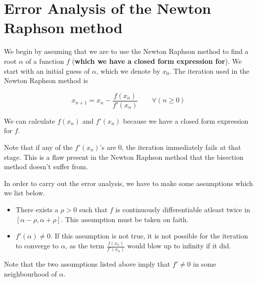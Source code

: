 
\section{Error Analysis of the Newton Raphson method}

We begin by assuming that we are to use the Newton Raphson method to find a root $\alpha$ of a function $f$ (\textbf{which we have a closed form expression for}). We start with an initial guess of $\alpha$, which we denote by $x_0$.
The iteration used in the Newton Raphson method is
\begin{defn}
  \label{feb28:def:iter}
  \[
    x_{n+1} = x_n - \frac{f(x_n)}{f'(x_n)} \qquad \forall(n \geq 0)
  \]
\end{defn}
We can calculate $f(x_n)$ and $f'(x_n)$ because we have a closed form expression for $f$.

Note that if any of the $f'(x_n)$'s are 0, the iteration immediately fails at that stage. This is a flaw present in the Newton Raphson method that the bisection method doesn't suffer from.

In order to carry out the error analysis, we have to make some assumptions which we list below.
\begin{itemize}
\item
  There exists a $\rho > 0$ such that $f$ is continuously differentiable atleast twice in $[\alpha - \rho, \alpha + \rho]$. This assumption must be taken on faith.
\item
  $f'(\alpha) \neq 0$. If this assumption is not true, it is not possible for the iteration to converge to $\alpha$, as the term $\frac{f(x_n)}{f'(x_n)}$ would blow up to infinity if it did.
\end{itemize}

Note that the two assumptions listed above imply that $f' \neq 0$ in some neighbourhood of $\alpha$.

